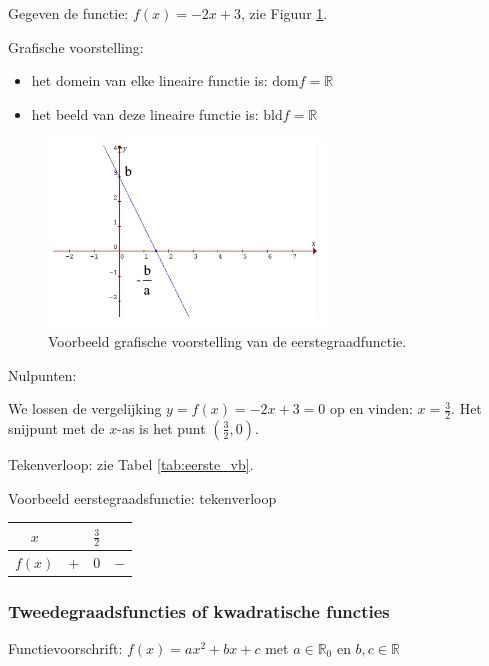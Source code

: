 \begin{voorbeeld}
	Gegeven de functie: $f(x)=-2x+3$, zie Figuur \ref{fig:eerste_vb_graf}.

Grafische voorstelling:
\begin{itemize}
\item het domein van elke lineaire functie is: $\textrm{dom}f=\mathbb{R}$
\item het beeld van deze lineaire functie is: $\textrm{bld}f=\mathbb{R}$
\end{itemize}
\begin{figure}[h]
\centering{}\includegraphics[height=5cm]{2_elem_rekenvaardigheden_B/inputs/eerstegraadsfuncties3.jpg}
\caption{Voorbeeld grafische voorstelling van de eerstegraadfunctie.}
\label{fig:eerste_vb_graf} 
\end{figure}


Nulpunten:

We lossen de vergelijking $y=f(x)=-2x+3=0$ op en vinden:
$x=\frac{3}{2}$. Het snijpunt met de $x$-as is het punt $(\frac{3}{2},0)$.

Tekenverloop: zie Tabel \ref{tab:eerste_vb}.

\begin{tabel}{Voorbeeld eerstegraadsfunctie: tekenverloop}
\begin{tabular}{c||c|c|c}
	$x$ &  & $\frac{3}{2}$ & \\
	\hline 
	$f(x)$ & $+$ & 0 & $-$\\
\end{tabular}
\label{tab:eerste_vb}	
\end{tabel}

\end{voorbeeld}

\subsubsection{Tweedegraadsfuncties of kwadratische functies}



\begin{definitie}
	Functievoorschrift: $f(x)=ax^{2}+bx+c$ met $a\in\mathbb{R}_{0}$
en $b,c\in\mathbb{R}$ 

\end{definitie}

